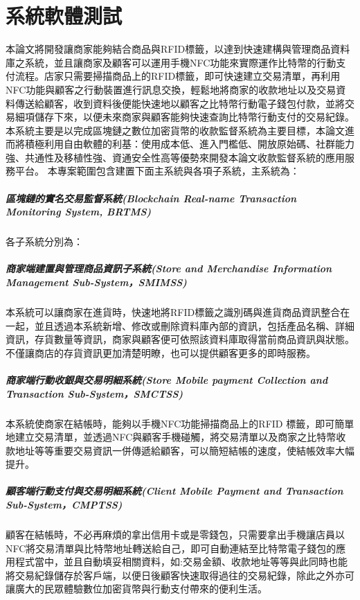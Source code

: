 
\chapter{系統軟體測試}

本論文將開發讓商家能夠結合商品與RFID標籤，以達到快速建構與管理商品資料庫之系統，並且讓商家及顧客可以運用手機NFC功能來實際運作比特幣的行動支付流程。店家只需要掃描商品上的RFID標籤，即可快速建立交易清單，再利用NFC功能與顧客之行動裝置進行訊息交換，輕鬆地將商家的收款地址以及交易資料傳送給顧客，收到資料後便能快速地以顧客之比特幣行動電子錢包付款，並將交易細項儲存下來，以便未來商家與顧客能夠快速查詢比特幣行動支付的交易紀錄。
本系統主要是以完成區塊鏈之數位加密貨幣的收款監督系統為主要目標，本論文進而將積極利用自由軟體的利基：使用成本低、進入門檻低、開放原始碼、社群能力強、共通性及移植性強、資通安全性高等優勢來開發本論文收款監督系統的應用服務平台。
本專案範圍包含建置下面主系統與各項子系統，主系統為：
		\paragraph{區塊鏈的實名交易監督系統(Blockchain Real-name Transaction Monitoring System, BRTMS)}

各子系統分別為：
 		\paragraph{商家端建置與管理商品資訊子系統(Store and Merchandise Information Management Sub-System，SMIMSS)}本系統可以讓商家在進貨時，快速地將RFID標籤之識別碼與進貨商品資訊整合在一起，並且透過本系統新增、修改或刪除資料庫內部的資訊，包括產品名稱、詳細資訊，存貨數量等資訊，商家與顧客便可依照該資料庫取得當前商品資訊與狀態。不僅讓商店的存貨資訊更加清楚明瞭，也可以提供顧客更多的即時服務。
 		\paragraph{商家端行動收銀與交易明細系統(Store Mobile payment Collection and Transaction Sub-System，SMCTSS)}本系統使商家在結帳時，能夠以手機NFC功能掃描商品上的RFID 標籤，即可簡單地建立交易清單，並透過NFC與顧客手機碰觸，將交易清單以及商家之比特幣收款地址等等重要交易資訊一併傳遞給顧客，可以簡短結帳的速度，使結帳效率大幅提升。 
 		\paragraph{顧客端行動支付與交易明細系統(Client Mobile Payment and Transaction Sub-System，CMPTSS)}顧客在結帳時，不必再麻煩的拿出信用卡或是零錢包，只需要拿出手機讓店員以NFC將交易清單與比特幣地址轉送給自己，即可自動連結至比特幣電子錢包的應用程式當中，並且自動填妥相關資料，如:交易金額、收款地址等等與此同時也能將交易紀錄儲存於客戶端，以便日後顧客快速取得過往的交易紀錄，除此之外亦可讓廣大的民眾體驗數位加密貨幣與行動支付帶來的便利生活。

